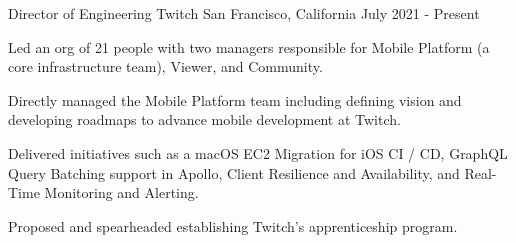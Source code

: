

\begin{cventries}

  \cventry
    {Director of Engineering} %
    {Twitch} %
    {San Francisco, California} %
    {July 2021 - Present} %
    {
	\begin{cvitems} %
	\item Led an org of 21 people with two managers responsible for Mobile Platform (a core infrastructure team), Viewer, and Community.
	\item Directly managed the Mobile Platform team including defining vision and developing roadmaps to advance mobile development at Twitch.
	\item Delivered initiatives such as a macOS EC2 Migration for iOS CI / CD, GraphQL Query Batching support in Apollo, Client Resilience and Availability, and Real-Time Monitoring and Alerting.
	\item Proposed and spearheaded establishing Twitch’s apprenticeship program.
	\end{cvitems}
    }


\end{cventries}
